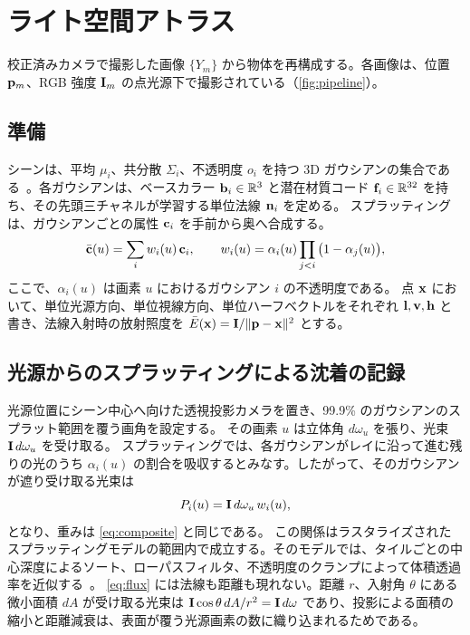 \section{ライト空間アトラス}
\label{sec:method}



校正済みカメラで撮影した画像 $\{Y_m\}$ から物体を再構成する。各画像は、位置 $\mathbf{p}_m$、RGB 強度 $\mathbf{I}_m$ の点光源下で撮影されている（\cref{fig:pipeline}）。

\subsection{準備}
\label{sec:prelim}
シーンは、平均 $\mu_i$、共分散 $\Sigma_i$、不透明度 $o_i$ を持つ 3D ガウシアンの集合である~\cite{kerbl20233d}。各ガウシアンは、ベースカラー $\mathbf{b}_i\in\mathbb R^3$ と潜在材質コード $\mathbf{f}_i\in\mathbb R^{32}$ を持ち、その先頭三チャネルが学習する単位法線 $\mathbf{n}_i$ を定める。
スプラッティングは、ガウシアンごとの属性 $\mathbf{c}_i$ を手前から奥へ合成する。
\begin{equation}
  \bar{\mathbf{c}}(u)=\sum_i w_i(u)\,\mathbf{c}_i,\qquad w_i(u)=\alpha_i(u)\prod_{j<i}\big(1-\alpha_j(u)\big),
  \label{eq:composite}
\end{equation}
ここで、$\alpha_i(u)$ は画素 $u$ におけるガウシアン $i$ の不透明度である。
点 $\mathbf{x}$ において、単位光源方向、単位視線方向、単位ハーフベクトルをそれぞれ $\mathbf{l},\mathbf{v},\mathbf{h}$ と書き、法線入射時の放射照度を $\bar E(\mathbf{x})=\mathbf{I}/\|\mathbf{p}-\mathbf{x}\|^2$ とする。

\subsection{光源からのスプラッティングによる沈着の記録}
\label{sec:deposit}
光源位置にシーン中心へ向けた透視投影カメラを置き、99.9\% のガウシアンのスプラット範囲を覆う画角を設定する。
その画素 $u$ は立体角 $d\omega_u$ を張り、光束 $\mathbf{I}\,d\omega_u$ を受け取る。
スプラッティングでは、各ガウシアンがレイに沿って進む残りの光のうち $\alpha_i(u)$ の割合を吸収するとみなす。したがって、そのガウシアンが遮り受け取る光束は
\begin{equation}
  P_i(u)=\mathbf{I}\,d\omega_u\,w_i(u),
  \label{eq:flux}
\end{equation}
となり、重みは \cref{eq:composite} と同じである。
この関係はラスタライズされたスプラッティングモデルの範囲内で成立する。そのモデルでは、タイルごとの中心深度によるソート、ローパスフィルタ、不透明度のクランプによって体積透過率を近似する~\cite{radl2024stopthepop,huang2024error,talegaonkar2025volumetrically,yu2024mip}。
\cref{eq:flux} には法線も距離も現れない。距離 $r$、入射角 $\theta$ にある微小面積 $dA$ が受け取る光束は $\mathbf{I}\cos\theta\,dA/r^2=\mathbf{I}\,d\omega$ であり、投影による面積の縮小と距離減衰は、表面が覆う光源画素の数に織り込まれるためである。

